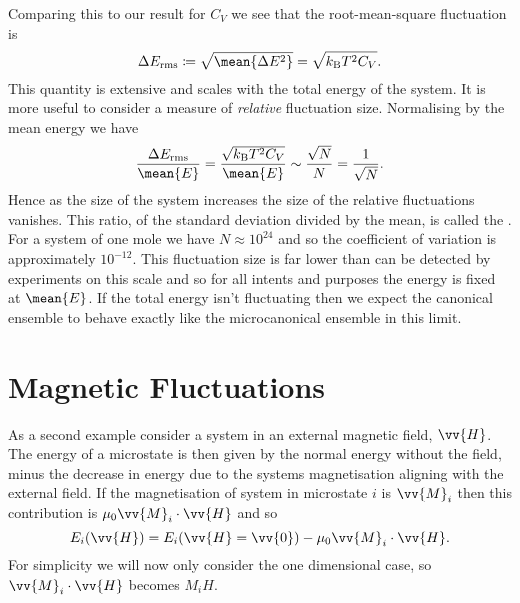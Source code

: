 \documentclass[fleqn]{NotesClass}
\newcommand*{\boltzmann}{k_{\mathrm{B}}}
\begin{document}
    Comparing this to our result for \(C_V\) we see that the root-mean-square fluctuation is
    \begin{equation}
        \Delta E_{\mathrm{rms}} \coloneqq \sqrt{\mean{\Delta E^2}} = \sqrt{\boltzmann T^2 C_V}.
    \end{equation}
    This quantity is extensive and scales with the total energy of the system.
    It is more useful to consider a measure of \emph{relative} fluctuation size.
    Normalising by the mean energy we have
    \begin{equation}
        \frac{\Delta E_{\mathrm{rms}}}{\mean{E}} = \frac{\sqrt{\boltzmann T^2C_V}}{\mean{E}} \sim \frac{\sqrt{N}}{N} = \frac{1}{\sqrt{N}}.
    \end{equation}
    Hence as the size of the system increases the size of the relative fluctuations vanishes.
    This ratio, of the standard deviation divided by the mean, is called the .
    For a system of one mole we have \(N \approx 10^{24}\) and so the coefficient of variation is approximately \(10^{-12}\).
    This fluctuation size is far lower than can be detected by experiments on this scale and so for all intents and purposes the energy is fixed at \(\mean{E}\).
    If the total energy isn't fluctuating then we expect the canonical ensemble to behave exactly like the microcanonical ensemble in this limit.
    
    \section{Magnetic Fluctuations}
    As a second example consider a system in an external magnetic field, \(\vv{H}\).
    The energy of a microstate is then given by the normal energy without the field, minus the decrease in energy due to the systems magnetisation aligning with the external field.
    If the magnetisation of system in microstate \(i\) is \(\vv{M}_i\) then this contribution is \(\mu_0\vv{M}_i \cdot \vv{H}\) and so
    \begin{equation}
        E_i(\vv{H}) = E_i(\vv{H} = \vv{0}) - \mu_0\vv{M}_i \cdot \vv{H}.
    \end{equation}
    For simplicity we will now only consider the one dimensional case, so \(\vv{M}_i\cdot\vv{H}\) becomes \(M_iH\).
    
\end{document}
